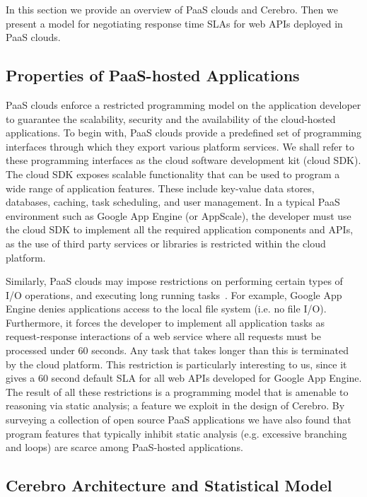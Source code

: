 In this section we provide an overview of PaaS clouds and Cerebro. Then we present a model for 
negotiating response time SLAs for web APIs deployed in PaaS clouds.

\vspace{-0.1in}
\subsection{ Properties of PaaS-hosted Applications}
\vspace{-0.1in}
PaaS clouds enforce a restricted programming model on the application developer to guarantee
the scalability, security and the availability of the cloud-hosted applications. To begin with,
PaaS clouds provide a predefined set of programming interfaces through which they export 
various platform services. We shall refer to these programming interfaces as the cloud software
development kit (cloud SDK). The cloud SDK exposes scalable functionality that can be used to 
program a wide range of application features. These include key-value data stores, databases, 
caching, task scheduling, and user management. In a typical PaaS environment
such as Google App Engine (or AppScale), the developer must use the cloud SDK to implement
all the required application components and APIs, as the use of third party services or libraries is
restricted within the cloud platform. 

Similarly, PaaS clouds may impose restrictions on performing
certain types of I/O operations, and executing long running tasks~\cite{gae-limits,azure-limits,gae-sandbox}. 
For example, Google App Engine
denies applications access to the local file system (i.e. no file I/O). Furthermore, it forces the
developer to implement all application tasks as request-response interactions of a web service
where all requests must be processed
under 60 seconds. Any task that takes longer than this is terminated by the cloud platform.
This restriction is particularly interesting to us, since it gives a 60 second default SLA
for all web APIs developed for Google App Engine.
The result of all these restrictions is a programming model that is
amenable to reasoning via static analysis; a feature we exploit in the design of Cerebro. By surveying
a collection of open source PaaS applications we have also found that program features that typically
inhibit static analysis (e.g. excessive branching and loops) are scarce among PaaS-hosted
applications.

\vspace{-0.1in}
\subsection{ Cerebro Architecture and Statistical Model}
\vspace{-0.1in}

